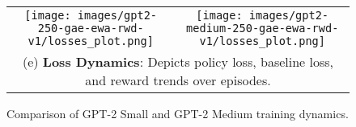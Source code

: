 \documentclass{article}
\begin{document}
\begin{figure*}[ht!]
\begin{tabular}{cc}
        \texttt{[image: images/gpt2-250-gae-ewa-rwd-v1/losses\_plot.png]} &
        \texttt{[image: images/gpt2-medium-250-gae-ewa-rwd-v1/losses\_plot.png]} \\
        \multicolumn{2}{c}{\small \parbox{\textwidth}{(e) \textbf{Loss Dynamics}: Depicts policy loss, baseline loss, and reward trends over episodes.}} \\
		\end{tabular}
		
		\caption{\small Comparison of GPT-2 Small and GPT-2 Medium training dynamics.}
		\label{fig:appendix-b}
	\end{figure*}
	
\end{document}
